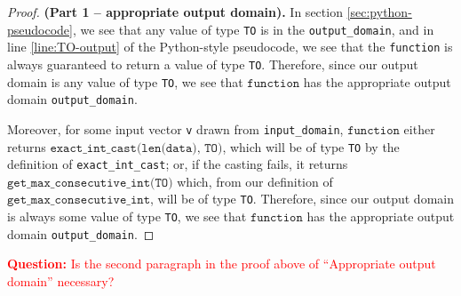 \documentclass[12pt,letterpaper]{article}
\newcommand{\question}[1]{\textcolor{red}{\textbf{Question:} #1}}
\newcommand{\function}{\texttt{function}}
\theoremstyle{definition}
\begin{document}
\begin{proof} \textbf{(Part 1 -- appropriate output domain).}
In section \ref{sec:python-pseudocode}, we see that any value of type \texttt{TO} is in the \texttt{output\_domain}, and in line \ref{line:TO-output} of the Python-style pseudocode, we see that the \texttt{function} is always guaranteed to return a value of type \texttt{TO}. Therefore, since our output domain is any value of type \texttt{TO}, we see that $\function$ has the appropriate output domain \texttt{output\_domain}.

Moreover, for some input vector \texttt{v} drawn from \texttt{input\_domain}, $\function$ either returns $\texttt{exact\_int\_cast(len(data), TO)}$, which will be of type \texttt{TO} by the definition of \texttt{exact\_int\_cast}; or, if the casting fails, it returns $\texttt{get\_max\_consecutive\_int(TO)}$ which, from our definition of $\texttt{get\_max\_consecutive\_int}$, will be of type \texttt{TO}. Therefore, since our output domain is always some value of type \texttt{TO}, we see that $\function$ has the appropriate output domain \texttt{output\_domain}.
\end{proof}

\question{Is the second paragraph in the proof above of ``Appropriate output domain'' necessary?}
\end{document}

